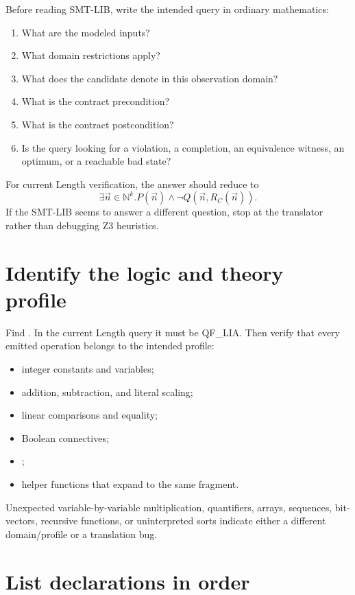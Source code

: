 \documentclass[10pt,letterpaper,oneside]{report}
\newcommand{\code}[1]{\texttt{\detokenize{#1}}}
\newcommand{\QFLIA}{\textsf{QF\_LIA}}
\newcommand{\Nat}{\mathbb{N}}
\begin{document}
Before reading SMT-LIB, write the intended query in ordinary mathematics:

\begin{enumerate}
\item What are the modeled inputs?
\item What domain restrictions apply?
\item What does the candidate denote in this observation domain?
\item What is the contract precondition?
\item What is the contract postcondition?
\item Is the query looking for a violation, a completion, an equivalence witness, an optimum, or a reachable bad state?
\end{enumerate}

For current Length verification, the answer should reduce to
\[
  \exists\vec n\in\Nat^k.
  P(\vec n)\land\neg Q(\vec n,R_C(\vec n)).
\]
If the SMT-LIB seems to answer a different question, stop at the translator rather than debugging Z3 heuristics.

\section{Identify the logic and theory profile}

Find \code{set-logic}. In the current Length query it must be \QFLIA. Then verify that every emitted operation belongs to the intended profile:

\begin{itemize}
\item integer constants and variables;
\item addition, subtraction, and literal scaling;
\item linear comparisons and equality;
\item Boolean connectives;
\item \code{ite};
\item helper functions that expand to the same fragment.
\end{itemize}

Unexpected variable-by-variable multiplication, quantifiers, arrays, sequences, bit-vectors, recursive functions, or uninterpreted sorts indicate either a different domain/profile or a translation bug.

\section{List declarations in order}
\end{document}
